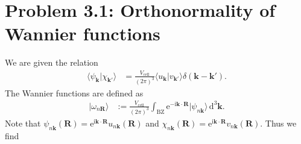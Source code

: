 \documentclass[english, parskip=full]{scrartcl}
\title{\titel}
\author{\autor}
\date{\today}
\newcommand{\brak}{}
\newcommand{\intx}{}
\newcommand{\kla}{}
\newcommand{\tecxt}{}
\newcommand{\Ket}{}
\renewcommand{\i}{\text{i}}
\newcommand{\e}{\text{e}}
\begin{document}
\maketitle  %

\section*{Problem 3.1: Orthonormality of Wannier functions}
We are given the relation
\begin{align}
\brak\langle \psi_\mathbf{k} | \chi_{\mathbf{k}'} \rangle &= \frac{V_\tecxt\text{cell}}{(2\pi)^3} \brak\langle u_\mathbf{k} | v_{\mathbf{k}'} \rangle \delta\kla\left( \mathbf{k} - \mathbf{k}' \right).
\end{align}
The Wannier functions are defined as
\begin{align}
\Ket | \omega_{n \mathbf{R}} \rangle &:= \frac{V_\tecxt\text{cell}}{(2\pi)^3} \intx\int_{\tecxt\text{BZ}}^{ } \e^{-\i\mathbf{k}\cdot\mathbf{R}} | \psi_{n\mathbf{k}} \rangle\, \mathrm{d}^3\mathbf{k}.
\end{align}
Note that $\psi_{n\mathbf{k}}(\mathbf{R}) = \e^{\i\mathbf{k}\cdot \mathbf{R}} u_{n\mathbf{k}} (\mathbf{R})$ and $\chi_{n\mathbf{k}}(\mathbf{R}) = \e^{\i\mathbf{k}\cdot \mathbf{R}} v_{n\mathbf{k}} (\mathbf{R})$.
Thus we find
\end{document}
